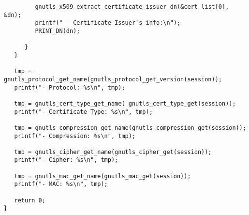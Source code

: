 \begin{verbatim}
         gnutls_x509_extract_certificate_issuer_dn(&cert_list[0], &dn);
         printf(" - Certificate Issuer's info:\n");
         PRINT_DN(dn);

      }
   }

   tmp = gnutls_protocol_get_name(gnutls_protocol_get_version(session));
   printf("- Protocol: %s\n", tmp);

   tmp = gnutls_cert_type_get_name( gnutls_cert_type_get(session));
   printf("- Certificate Type: %s\n", tmp);

   tmp = gnutls_compression_get_name(gnutls_compression_get(session));
   printf("- Compression: %s\n", tmp);

   tmp = gnutls_cipher_get_name(gnutls_cipher_get(session));
   printf("- Cipher: %s\n", tmp);

   tmp = gnutls_mac_get_name(gnutls_mac_get(session));
   printf("- MAC: %s\n", tmp);

   return 0;
}

\end{verbatim}
